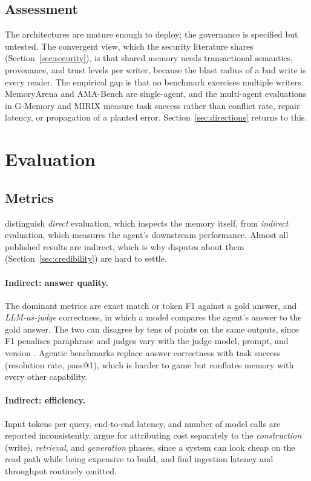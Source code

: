 \documentclass[11pt]{article}
\begin{document}
\subsection{Assessment}

The architectures are mature enough to deploy; the governance is specified but untested. The convergent view, which the security literature shares (Section~\ref{sec:security}), is that shared memory needs transactional semantics, provenance, and trust levels per writer, because the blast radius of a bad write is every reader. The empirical gap is that no benchmark exercises multiple writers: MemoryArena and AMA-Bench are single-agent, and the multi-agent evaluations in G-Memory and MIRIX measure task success rather than conflict rate, repair latency, or propagation of a planted error. Section~\ref{sec:directions} returns to this.

\section{Evaluation}
\label{sec:eval}

\subsection{Metrics}

\citet{zhang2024survey} distinguish \emph{direct} evaluation, which inspects the memory itself, from \emph{indirect} evaluation, which measures the agent's downstream performance. Almost all published results are indirect, which is why disputes about them (Section~\ref{sec:credibility}) are hard to settle.

\paragraph{Indirect: answer quality.} The dominant metrics are exact match or token F1 against a gold answer, and \emph{LLM-as-judge} correctness, in which a model compares the agent's answer to the gold answer. The two can disagree by tens of points on the same outputs, since F1 penalises paraphrase and judges vary with the judge model, prompt, and version \citep{jiang2026anatomy}. Agentic benchmarks replace answer correctness with task success (resolution rate, pass@1), which is harder to game but conflates memory with every other capability.

\paragraph{Indirect: efficiency.} Input tokens per query, end-to-end latency, and number of model calls are reported inconsistently. \citet{omri2026systems} argue for attributing cost separately to the \emph{construction} (write), \emph{retrieval}, and \emph{generation} phases, since a system can look cheap on the read path while being expensive to build, and \citet{jiang2026anatomy} find ingestion latency and throughput routinely omitted.
\end{document}
